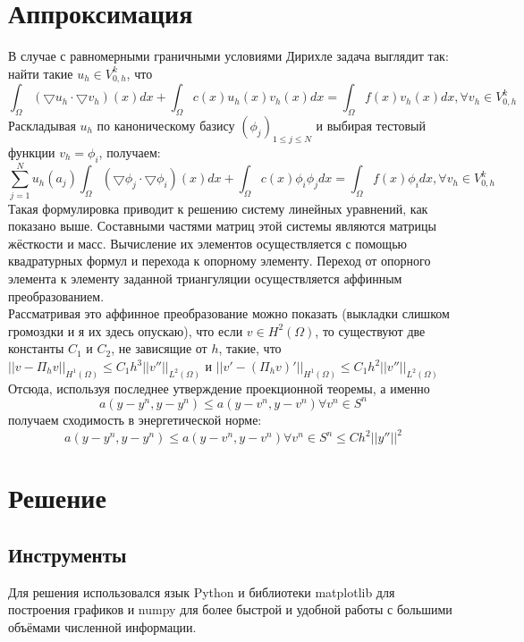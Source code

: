\documentclass[paper=a4, fontsize=13pt]{scrartcl} %
\numberwithin{equation}{section} %
\numberwithin{figure}{section} %
\numberwithin{table}{section} %
\begin{document}
\section{Аппроксимация}
В случае с равномерными граничными условиями Дирихле задача выглядит так: найти такие $u_h \in V^k_{0,h}$, что
$$\int_{\Omega}(\bigtriangledown u_h \cdot \bigtriangledown v_h) (x) dx + \int_{\Omega} c(x)u_h(x)v_h(x)dx = \int_{\Omega}f(x)v_h(x)dx, \forall v_h \in V^{k}_{0,h}$$
Раскладывая $u_h$ по каноническому базису $(\phi_j)_{1 \le j \le N}$ и выбирая тестовый функции $v_h = \phi_i$, получаем:
$$\sum^N_{j=1}u_h(a_j) \int_{\Omega}(\bigtriangledown \phi_j \cdot \bigtriangledown \phi_i) (x) dx + \int_{\Omega} c(x) \phi_i \phi_j dx = \int_{\Omega}f(x) \phi_i dx, \forall v_h \in V^{k}_{0,h}$$
Такая формулировка приводит к решению систему линейных уравнений, как показано выше. Составными частями матриц этой системы являются матрицы жёсткости и масс. Вычисление их элементов осуществляется с помощью квадратурных формул и перехода к опорному элементу.
Переход от опорного элемента к элементу заданной триангуляции осуществляется аффинным преобразованием.\\
Рассматривая это аффинное преобразование можно показать (выкладки слишком громоздки и я их здесь опускаю), что если $v \in H^2(\Omega)$, то существуют две константы $C_1$ и $C_2$, не зависящие от $h$, такие, что $||v - \Pi_h v||_{H^1(\Omega)} \le C_1 h^3 ||v''||_{L^2(\Omega)}$ и $||v' - (\Pi_h v)'||_{H^1(\Omega)} \le C_1 h^2 ||v''||_{L^2(\Omega)}$
Отсюда, используя последнее утверждение проекционной теоремы, а именно
$$a(y-y^n, y-y^n) \le a(y-v^n, y-v^n) \forall v^n \in S^n$$
 получаем сходимость в энергетической норме:
$$a(y-y^n, y-y^n) \le a(y-v^n, y-v^n) \forall v^n \in S^n \le C h^2 ||y''||^2$$

\newpage
\section{Решение}
\subsection{Инструменты}
Для решения использовался язык Python и библиотеки matplotlib для построения графиков и numpy для более быстрой и удобной работы с большими объёмами численной информации.
\end{document}
